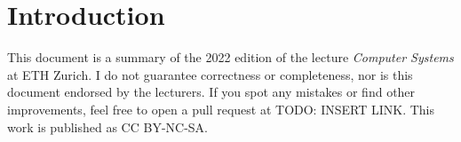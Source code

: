 \section{Introduction}

This document is a summary of the 2022 edition of the lecture \textit{Computer Systems} at ETH Zurich. I do not guarantee correctness or completeness, nor is this document endorsed by the lecturers. If you spot any mistakes or find other improvements, feel free to open a pull request at TODO: INSERT LINK. This work is published as CC BY-NC-SA.
\begin{center}
	\ccbyncsa
\end{center}